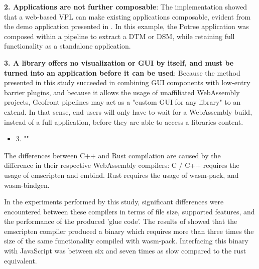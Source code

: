 \textbf{2. Applications are not further composable}:
The implementation showed that a web-based VPL can make existing applications composable, evident from the demo application presented in .
In this example, the Potree application was composed within a pipeline to extract a DTM or DSM, while retaining full functionality as a standalone application.

\textbf{3. A library offers no visualization or GUI by itself, and must be turned into an application before it can be used}:
Because the method presented in this study succeeded in combining \ac{GUI} components with low-entry barrier plugins, and because it allows the usage of unaffiliated WebAssembly projects, Geofront pipelines may act as a "custom GUI for any library" to an extend. 
In that sense, end users will only have to wait for a WebAssembly build, instead of a full application, before they are able to access a libraries content.

\begin{itemize}[ ]
  \item 3. "\myNewSubRQThree"
\end{itemize}


The differences between C++ and Rust compilation are caused by the \\ difference in their respective WebAssembly compilers:
C / C++ requires the usage of emscripten and embind. 
Rust requires the usage of wasm-pack, and wasm-bindgen.

In the experiments performed by this study, significant differences were encountered between these compilers in terms of file size, supported features, and the performance of the produced 'glue code'.
The results of  showed that the emscripten compiler produced a binary which requires more than three times the size of the same functionality compiled with wasm-pack.
Interfacing this binary with JavaScript was between six and seven times as slow compared to the rust equivalent.

